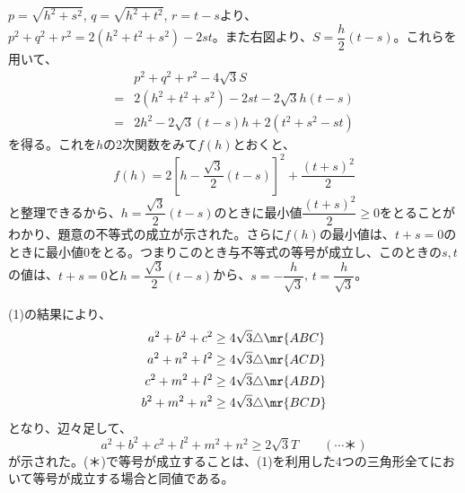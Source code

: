 $p=\sqrt{h^2+s^2}$, $q=\sqrt{h^2+t^2}$, $r=t-s$より、$p^2+q^2+r^2=2(h^2+t^2+s^2)-2st$。また右図より、$S=\dfrac{h}{2}(t-s)$。これらを用いて、
\begin{align*}
 &p^2+q^2+r^2-4\sqrt{3}S \\
 =&2(h^2+t^2+s^2)-2st-2\sqrt{3}h(t-s) \\
 =&2h^2-2\sqrt{3}(t-s)h+2(t^2+s^2-st)
\end{align*}
を得る。これを$h$の2次関数をみて$f(h)$とおくと、
\[ f(h)=2\left[h-\frac{\sqrt{3}}{2}(t-s)\right]^2+\frac{(t+s)^2}{2} \]
と整理できるから、$h=\dfrac{\sqrt{3}}{2}(t-s)$のときに最小値$\dfrac{(t+s)^2}{2}\ge 0$をとることがわかり、題意の不等式の成立が示された。さらに$f(h)$の最小値は、$t+s=0$のときに最小値0をとる。つまりこのとき与不等式の等号が成立し、このときの$s, t$の値は、$t+s=0$と$h=\dfrac{\sqrt{3}}{2}(t-s)$から、$s=-\dfrac{h}{\sqrt{3}}$, $t=\dfrac{h}{\sqrt{3}}$。

(1)の結果により、
\begin{align*}
 a^2+b^2+c^2&\ge 4\sqrt{3}\triangle\mr{ABC} \\
 a^2+n^2+l^2&\ge 4\sqrt{3}\triangle\mr{ACD} \\
 c^2+m^2+l^2&\ge 4\sqrt{3}\triangle\mr{ABD} \\
 b^2+m^2+n^2&\ge 4\sqrt{3}\triangle\mr{BCD} \\
\end{align*}
となり、辺々足して、
\[ a^2+b^2+c^2+l^2+m^2+n^2 \ge 2\sqrt{3}T \qquad (\cdots \text{＊}) \]
が示された。(＊)で等号が成立することは、(1)を利用した4つの三角形全てにおいて等号が成立する場合と同値である。

